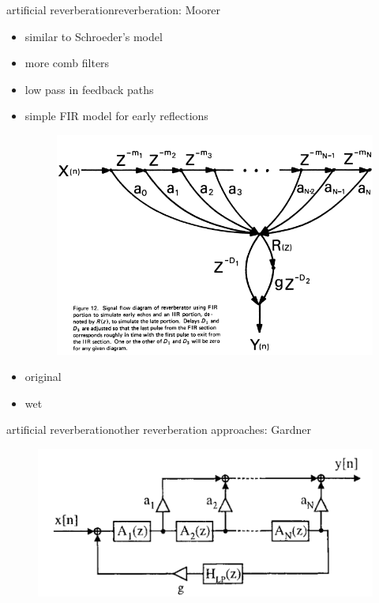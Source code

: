 \begin{frame}{artificial reverberation}{reverberation: Moorer}
	\begin{itemize}
		\item	similar to Schroeder's model
		\item	more comb filters
		\item	low pass in feedback paths
		\item	simple FIR model for early reflections
        \begin{figure}
            \includegraphics[scale=.3]{graph/moorer}
        \end{figure}
	\end{itemize}
    \pause
    \begin{itemize}
        \item   original 
        \item   wet 
    \end{itemize}
\end{frame}

\begin{frame}{artificial reverberation}{other reverberation approaches: Gardner}
	\begin{figure}
		\centerline{\includegraphics[scale=.4]{graph/gardnerreverb}}
	\end{figure} 
\end{frame}

